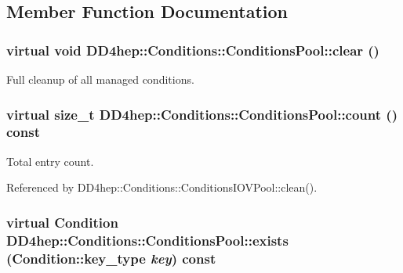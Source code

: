 \subsection{Member Function Documentation}
\hypertarget{class_d_d4hep_1_1_conditions_1_1_conditions_pool_aaa515e23b412a5da244f6c4e6bf13220}{
\subsubsection[{clear}]{\setlength{\rightskip}{0pt plus 5cm}virtual void DD4hep::Conditions::ConditionsPool::clear ()}}
\label{class_d_d4hep_1_1_conditions_1_1_conditions_pool_aaa515e23b412a5da244f6c4e6bf13220}


Full cleanup of all managed conditions. \hypertarget{class_d_d4hep_1_1_conditions_1_1_conditions_pool_a40326e9b162960c46e69cbdb451526d0}{
\subsubsection[{count}]{\setlength{\rightskip}{0pt plus 5cm}virtual size\_\-t DD4hep::Conditions::ConditionsPool::count () const}}
\label{class_d_d4hep_1_1_conditions_1_1_conditions_pool_a40326e9b162960c46e69cbdb451526d0}


Total entry count. 

Referenced by DD4hep::Conditions::ConditionsIOVPool::clean().\hypertarget{class_d_d4hep_1_1_conditions_1_1_conditions_pool_aa37de3a69489da065b3515c7119b3145}{
\subsubsection[{exists}]{\setlength{\rightskip}{0pt plus 5cm}virtual {\bf Condition} DD4hep::Conditions::ConditionsPool::exists ({\bf Condition::key\_\-type} {\em key}) const}}
\label{class_d_d4hep_1_1_conditions_1_1_conditions_pool_aa37de3a69489da065b3515c7119b3145}


